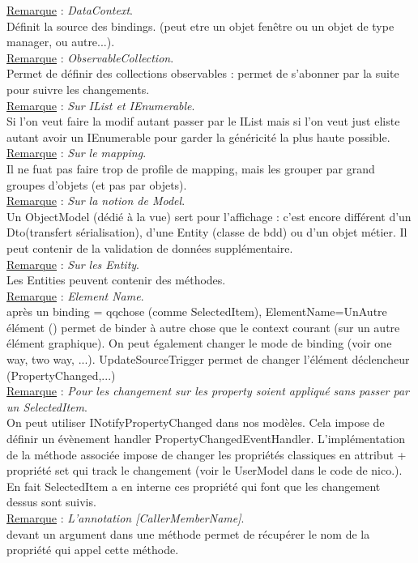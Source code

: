 \documentclass[a4paper,12pt,twoside]{article}
\newcommand{\incode}[1]{{\footnotesize\ttfamily #1}} %
\newcommand{\rem}[2]{\noindent\underline{Remarque} : \textit{#1}.\\ \indent #2}
\begin{document}
\rem{DataContext}{Définit la source des bindings. (peut etre un objet fenêtre ou un objet de type manager, ou autre...).}\\

\rem{ObservableCollection}{Permet de définir des collections observables : permet de s'abonner par la suite pour suivre les changements.}\\

\rem{Sur IList et IEnumerable}{Si l'on veut faire la modif autant passer par le IList mais si l'on veut just eliste autant avoir un IEnumerable pour garder la généricité la plus haute possible.}\\

\rem{Sur le mapping}{Il ne fuat pas faire trop de profile de mapping, mais les grouper par grand groupes d'objets (et pas par objets).}\\

\rem{Sur la notion de Model}{ Un ObjectModel (dédié à la vue) sert pour l'affichage : c'est encore différent d'un Dto(transfert sérialisation), d'une Entity (classe de bdd) ou d'un objet métier. Il peut contenir de la validation de données supplémentaire.}\\

\rem{Sur les Entity}{Les Entities peuvent contenir des méthodes.}\\

\rem{Element Name}{après un binding = qqchose (comme SelectedItem), ElementName=UnAutre élément () permet de binder à autre chose que le context courant (sur un autre élément graphique). On peut également changer le \incode{mode} de binding (voir one way, two way, ...). \incode{UpdateSourceTrigger} permet de changer l'élément déclencheur (PropertyChanged,...)}\\

\rem{Pour les changement sur les property soient appliqué sans passer par un SelectedItem}{On peut utiliser INotifyPropertyChanged dans nos modèles. Cela impose de définir un évènement handler PropertyChangedEventHandler. L'implémentation de la méthode associée impose de changer les propriétés classiques en attribut + propriété set qui track le changement (voir le UserModel dans le code de nico.). En fait SelectedItem a en interne ces propriété qui font que les changement dessus sont suivis.}\\

\rem{L'annotation [CallerMemberName]}{devant un argument dans une méthode permet de récupérer le nom de la propriété qui appel cette méthode.}\\
\end{document}
